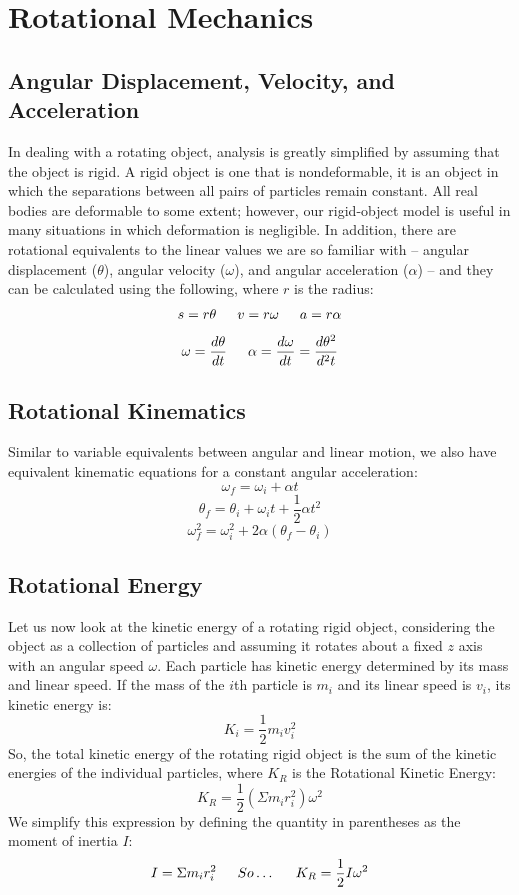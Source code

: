 \documentclass{article}
\begin{document}
\section{Rotational Mechanics}
\subsection{Angular Displacement, Velocity, and Acceleration}
In dealing with a rotating object, analysis is greatly simplified by assuming that the object is rigid. A rigid object is one that is nondeformable, it is an object in which the separations between all pairs of particles remain constant. All real bodies are deformable to some extent; however, our rigid-object model is useful in many situations in which deformation is negligible. In addition, there are rotational equivalents to the linear values we are so familiar with -- angular displacement ($\theta$), angular velocity ($\omega$), and angular acceleration ($\alpha$) -- and they can be calculated using the following, where $r$ is the radius:
\[
s=r\theta \indent
v=r\omega \indent
a=r\alpha
\]
\[
\omega=\frac{d\theta}{dt} \indent
\alpha=\frac{d\omega}{dt}=\frac{d\theta^2}{d^2t}
\]

\subsection{Rotational Kinematics}
Similar to variable equivalents between angular and linear motion, we also have equivalent kinematic equations for a constant angular acceleration:
\[
\omega_f=\omega_i+\alpha t
\]
\[
\theta_f=\theta_i+\omega_it+\frac{1}{2}\alpha t^2
\]
\[
\omega_f^2=\omega_i^2+2\alpha(\theta_f-\theta_i)
\]
\subsection{Rotational Energy}
Let us now look at the kinetic energy of a rotating rigid object, considering the object as a collection of particles and assuming it rotates about a fixed $z$ axis with an angular speed $\omega$. Each particle has kinetic energy determined by its mass and linear speed. If the mass of the $i$th particle is $m_i$ and its linear speed is $v_i$, its kinetic energy is:
\[
K_i=\frac{1}{2}m_iv_i^2
\]
So, the total kinetic energy of the rotating rigid object is the sum of the kinetic energies of the individual particles, where $K_R$ is the Rotational Kinetic Energy:
\[
K_R=\frac{1}{2}(\Sigma m_ir_i^2)\omega^2
\]
We simplify this expression by defining the quantity in parentheses as the moment of inertia $I$:
\[
I=\Sigma m_ir_i^2 \indent
So\ldots\indent
K_R=\frac{1}{2}I\omega^2
\]
\end{document}

